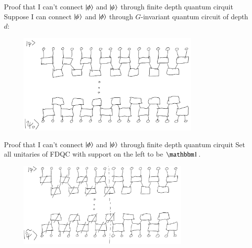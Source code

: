 \documentclass{beamer}
\begin{document}
\begin{frame}{Proof that I can't connect $\ket{\phi}$ and $\ket{\psi}$ through finite depth quantum cirquit}
	Suppose I can connect $\ket{\psi}$ and $\ket{\phi}$ through $G$-invariant quantum circuit of depth $d$:
	\begin{figure}
		\center
		\includegraphics[width=0.8\textwidth]{Figures/ConnectingPsiAndPsi0Proof.png}
	\end{figure}
\end{frame}

\begin{frame}{Proof that I can't connect $\ket{\phi}$ and $\ket{\psi}$ through finite depth quantum cirquit}
	Set all unitaries of FDQC with support on the left to be $\id$.
	\begin{figure}
		\center
		\includegraphics[width=0.75\textwidth]{Figures/ConnectingPsiAndPsi0Proof2.png}
	\end{figure}
\end{frame}
\end{document}
